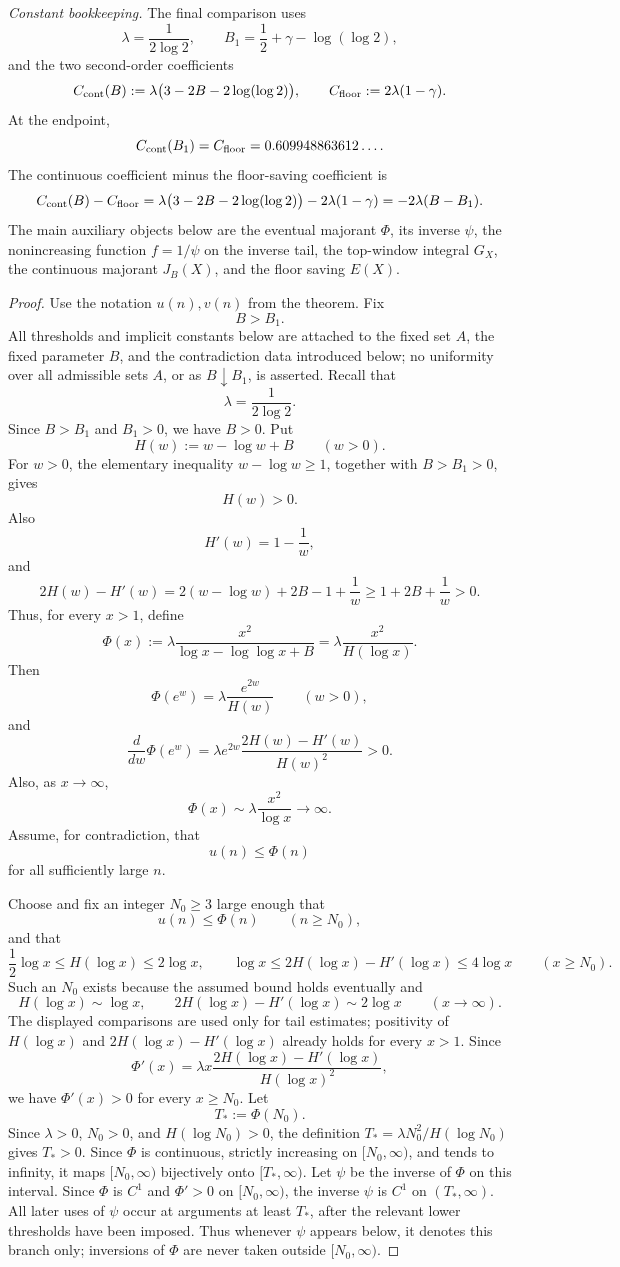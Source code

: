 \documentclass[11pt]{article}
\begin{document}
\noindent\textit{Constant bookkeeping.} The final comparison uses
\[
\lambda=\frac1{2\log 2},
\qquad
B_1=\frac12+\gamma-\log(\log 2),
\]
and the two second-order coefficients
\[
C_{\rm cont}(B):=\lambda\bigl(3-2B-2\log(\log 2)\bigr),
\qquad
C_{\rm floor}:=2\lambda(1-\gamma).
\]
At the endpoint,
\[
C_{\rm cont}(B_1)=C_{\rm floor}=0.609948863612\ldots.
\]
The continuous coefficient minus the floor-saving coefficient is
\[
C_{\rm cont}(B)-C_{\rm floor}
=\lambda\bigl(3-2B-2\log(\log 2)\bigr)-2\lambda(1-\gamma)
=-2\lambda(B-B_1).
\]
The main auxiliary objects below are the eventual majorant $\Phi$, its inverse $\psi$, the
nonincreasing function $f=1/\psi$ on the inverse tail, the top-window integral $G_X$, the
continuous majorant $J_B(X)$, and the floor saving $E(X)$.

\begin{proof}
Use the notation $u(n),v(n)$ from the theorem. Fix
\[
B>B_1.
\]
All thresholds and implicit constants below are attached to the fixed set $A$, the fixed parameter
$B$, and the contradiction data introduced below; no uniformity over all admissible sets $A$, or
as $B\downarrow B_1$, is asserted.
Recall that
\[
\lambda=\frac1{2\log 2}.
\]
Since $B>B_1$ and $B_1>0$, we have $B>0$. Put
\[
H(w):=w-\log w+B\qquad(w>0).
\]
For $w>0$, the elementary inequality $w-\log w\ge1$, together with $B>B_1>0$, gives
\[
H(w)>0.
\]
Also
\[
H'(w)=1-\frac1w,
\]
and
\[
2H(w)-H'(w)
=
2(w-\log w)+2B-1+\frac1w
\ge
1+2B+\frac1w>0.
\]
Thus, for every $x>1$, define
\[
\Phi(x):=\lambda\frac{x^2}{\log x-\log\log x+B}
=\lambda\frac{x^2}{H(\log x)}.
\]
Then
\[
\Phi(e^w)=\lambda\frac{e^{2w}}{H(w)}
\qquad(w>0),
\]
and
\[
\frac{d}{dw}\Phi(e^w)
=
\lambda e^{2w}\frac{2H(w)-H'(w)}{H(w)^2}>0.
\]
Also, as $x\to\infty$,
\[
\Phi(x)\sim \lambda\frac{x^2}{\log x}\to\infty.
\]
Assume, for contradiction, that
\[
u(n)\le \Phi(n)
\tag{1}\label{eq:upper-bound-assumption}
\]
for all sufficiently large $n$.

Choose and fix an integer $N_0\ge 3$ large enough that
\[
u(n)\le\Phi(n)\qquad(n\ge N_0),
\]
and that
\[
\frac12\log x\le H(\log x)\le 2\log x,
\qquad
\log x\le 2H(\log x)-H'(\log x)\le 4\log x
\qquad(x\ge N_0).
\]
Such an $N_0$ exists because the assumed bound holds eventually and
\[
H(\log x)\sim\log x,
\qquad
2H(\log x)-H'(\log x)\sim2\log x
\qquad(x\to\infty).
\]
The displayed comparisons are used only for tail estimates; positivity of $H(\log x)$ and
$2H(\log x)-H'(\log x)$ already holds for every $x>1$.
Since
\[
\Phi'(x)
=
\lambda x\frac{2H(\log x)-H'(\log x)}{H(\log x)^2},
\]
we have $\Phi'(x)>0$ for every $x\ge N_0$. Let
\[
T_*:=\Phi(N_0).
\]
Since $\lambda>0$, $N_0>0$, and $H(\log N_0)>0$, the definition
$T_*=\lambda N_0^2/H(\log N_0)$ gives $T_*>0$. Since $\Phi$ is continuous, strictly increasing on
$[N_0,\infty)$, and tends to infinity, it maps $[N_0,\infty)$ bijectively onto $[T_*,\infty)$.
Let $\psi$ be the inverse of $\Phi$ on this interval. Since $\Phi$ is $C^1$ and $\Phi'>0$ on
$[N_0,\infty)$, the inverse $\psi$ is $C^1$ on $(T_*,\infty)$. All later uses of $\psi$ occur
at arguments at least $T_*$, after the relevant lower thresholds have been imposed. Thus
whenever $\psi$ appears below, it denotes this branch only; inversions of $\Phi$ are never
taken outside $[N_0,\infty)$.


\end{proof}
\end{document}
